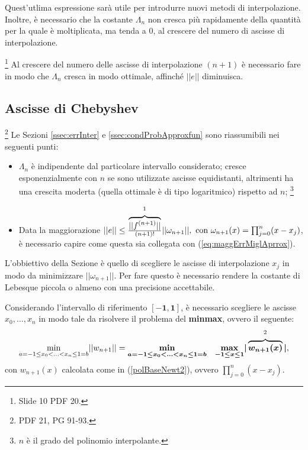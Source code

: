 
Quest'utlima espressione sarà utile per introdurre nuovi metodi di interpolazione. Inoltre, è necessario che la costante $\Lambda_n$ non cresca più rapidamente della quantità per la quale è moltiplicata, ma tenda a 0, al crescere del numero di ascisse di interpolazione.

\begin{remark}\footnote{Slide 10 PDF 20.}
    Al crescere del numero delle ascisse di interpolazione $(n+1)$ è necessario fare in modo che $\Lambda_n$ cresca in modo ottimale, affinché $||e||$ diminuisca.
\end{remark}

\subsection{Ascisse di Chebyshev}\label{ssec:AscCheb}\footnote{PDF 21, PG 91-93.}
Le Sezioni \ref{ssec:errInter} e \ref{ssec:condProbApproxfun} sono riassumibili nei seguenti punti:
\begin{itemize}
    \item $\Lambda_n$ è indipendente dal particolare intervallo considerato; cresce esponenzialmente con $n$ se sono utilizzate ascisse equidistanti, altrimenti ha una crescita moderta (quella ottimale è di tipo logaritmico) rispetto ad $n$; \footnote{$n$ è il grado del polinomio interpolante.}
    \item Data la maggiorazione $||e||\leq \frac{\overbrace{||f^{(n+1)}||}^{\footnotemark}}{(n+1)!}||\omega_{n+1}||,\text{ con } \omega_{n+1}(x)=\prod_{j=0}^n(x-x_j)$, è necessario capire come questa sia collegata con (\ref{eq:maggErrMiglAprrox}). 
\end{itemize}

L'obbiettivo della Sezione è  quello di scegliere le ascisse di interpolazione $x_j$ in modo da minimizzare $||\omega_{n+1}||$. Per fare questo è necessario rendere la costante di Lebesque piccola o almeno con una precisione accettabile.

Considerando l'intervallo di riferimento $\boldsymbol{[-1,1]}$, è necessario scegliere le ascisse $x_0,\hdots,x_n$ in modo tale da risolvere il problema del \textbf{minmax}, ovvero il seguente: \footnotemark
\begin{equation}\label{eq:minmax}
    \underset{a=-1\leq x_0<\hdots<x_n\leq 1=b}{\min}||w_{n+1}||=\boldsymbol{\underset{a=-1\leq x_0<\hdots<x_n\leq 1=b}{\min}\quad\underset{-1\leq x\leq 1}{\max}|}\overbrace{\boldsymbol{w_{n+1}(x)}}^{\footnotemark}\boldsymbol|,
\end{equation}
con $w_{n+1}(x)$ calcolata come in (\ref{polBaseNewt2}), ovvero $\prod_{j=0}^n(x-x_j)$.
\addtocounter{footnote}{-1}


